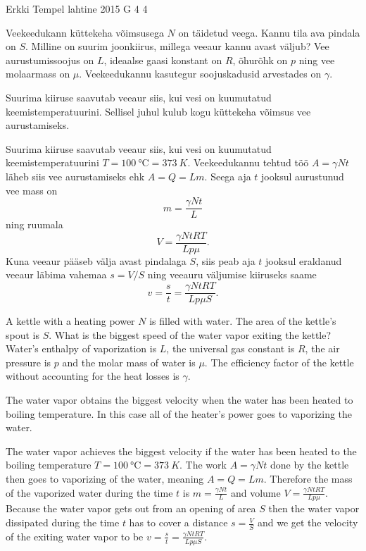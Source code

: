 {Erkki Tempel} %
{lahtine} %
{2015} %
{G 4} %
{4} %
{
\ifStatement
Veekeedukann küttekeha võimsusega $N$ on täidetud veega. Kannu tila ava pindala on $S$. Milline on suurim joonkiirus, millega veeaur kannu avast väljub? Vee aurustumissoojus on $L$, ideaalse gaasi konstant on $R$, õhurõhk on $p$ ning vee molaarmass on $\mu$. Veekeedukannu kasutegur soojuskadusid arvestades on $\gamma$.
\fi


\ifHint
Suurima kiiruse saavutab veeaur siis, kui vesi on kuumutatud keemistemperatuurini. Sellisel juhul kulub kogu küttekeha võimsus vee aurustamiseks.
\fi


\ifSolution
Suurima kiiruse saavutab veeaur siis, kui vesi on kuumutatud keemistemperatuurini $T=\SI{100}{\celsius}=\SI{373}{K}$. Veekeedukannu tehtud töö $A=\gamma Nt$ läheb siis vee aurustamiseks ehk $A=Q=Lm$. Seega aja $t$ jooksul aurustunud vee mass on
\[
m=\frac{\gamma Nt}{L}
\]
ning ruumala
\[
V=\frac{\gamma NtRT}{Lp\mu}.
\]
Kuna veeaur pääseb välja avast pindalaga $S$, siis peab aja $t$ jooksul eraldanud veeaur läbima vahemaa $s=V/S$ ning veeauru väljumise kiiruseks saame
\[
v=\frac{s}{t}=\frac{\gamma NtRT}{Lp\mu S}.
\]
\fi


\ifEngStatement
A kettle with a heating power $N$ is filled with water. The area of the kettle’s spout is $S$. What is the biggest speed of the water vapor exiting the kettle? Water’s enthalpy of vaporization is $L$, the universal gas constant is $R$, the air pressure is $p$ and the molar mass of water is $\mu$. The efficiency factor of the kettle without accounting for the heat losses is $\gamma$.
\fi


\ifEngHint
The water vapor obtains the biggest velocity when the water has been heated to boiling temperature. In this case all of the heater’s power goes to vaporizing the water.
\fi


\ifEngSolution
The water vapor achieves the biggest velocity if the water has been heated to the boiling temperature $T=\SI{100}{\celsius}=\SI{373}{K}$. The work $A=\gamma Nt$ done by the kettle then goes to vaporizing of the water, meaning $A=Q=Lm$. Therefore the mass of the vaporized water during the time $t$ is $m=\frac{\gamma Nt}{L}$ and volume $V=\frac{\gamma NtRT}{Lp\mu}$. Because the water vapor gets out from an opening of area $S$ then the water vapor dissipated during the time $t$ has to cover a distance $s=\frac{V}{S}$ and we get the velocity of the exiting water vapor to be $v=\frac{s}{t}=\frac{\gamma NtRT}{Lp\mu S}$.
\fi
}
